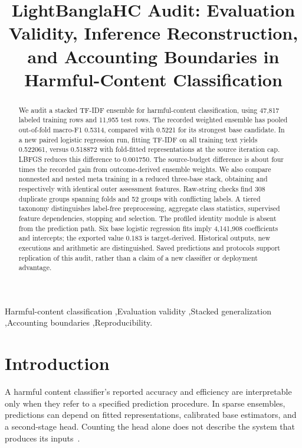 \documentclass[doublecolumn]{ijcvsplatex}
\begin{document}
\begin{frontmatter}

\title{\LARGE LightBanglaHC Audit: Evaluation Validity, Inference Reconstruction, and Accounting Boundaries in Harmful-Content Classification}


\begin{abstract}
We audit a stacked TF-IDF ensemble for harmful-content classification, using 47,817 labeled training rows and 11,955 test rows. The recorded weighted ensemble has pooled out-of-fold macro-F1 0.5314, compared with 0.5221 for its strongest base candidate. In a new paired logistic regression run, fitting TF-IDF on all training text yields 0.522061, versus 0.518872 with fold-fitted representations at the source iteration cap. LBFGS reduces this difference to 0.001750. The source-budget difference is about four times the recorded gain from outcome-derived ensemble weights. We also compare nonnested and nested meta training in a reduced three-base stack, obtaining \NonNested{} and \Nested{} respectively with identical outer assessment features. Raw-string checks find 308 duplicate groups spanning folds and 52 groups with conflicting labels. A tiered taxonomy distinguishes label-free preprocessing, aggregate class statistics, supervised feature dependencies, stopping and selection. The profiled identity module is absent from the prediction path. Six base logistic regression fits imply 4,141,908 coefficients and intercepts; the exported value 0.183 is target-derived. Historical outputs, new executions and arithmetic are distinguished. Saved predictions and protocols support replication of this audit, rather than a claim of a new classifier or deployment advantage.
\end{abstract}

\begin{keyword}
Harmful-content classification \sep Evaluation validity \sep Stacked
generalization \sep Accounting boundaries \sep Reproducibility.
\end{keyword}
\end{frontmatter}

\section{Introduction}
\label{sec:introduction}

A harmful content classifier's reported accuracy and efficiency are interpretable only when they refer to a specified prediction procedure. In sparse ensembles, predictions can depend on fitted representations, calibrated base estimators, and a second-stage head. Counting the head alone does not describe the system that produces its inputs~\cite{schwartz2020greenai}.
\end{document}
